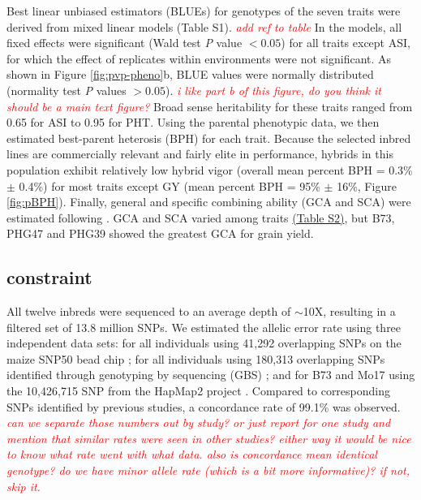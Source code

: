 \documentclass[9pt,twocolumn,twoside]{gsajnl}
\newcommand{\jri}[1]{\textcolor{red}{ \emph{ #1}} }
\begin{document}
Best linear unbiased estimators (BLUEs) for genotypes of the seven traits were derived from mixed linear models (Table S1). \DIFaddbegin \jri{add ref to table}
\DIFaddend In the models, all fixed effects were significant (Wald test \emph{P} value $<0.05$) for all traits except ASI, for which the effect of replicates within environments were not significant. 
As shown in Figure \ref{fig:pvp-pheno}b, BLUE values were normally distributed (normality test \emph{P} values $>0.05$). \DIFaddbegin \jri{i like part b of this figure, do you think it should be a main text figure?}
\DIFaddend Broad sense heritability for these traits ranged from 0.65 for ASI to 0.95 for PHT. 
Using the parental phenotypic data, we then estimated best-parent heterosis (BPH) for each trait.  
Because the selected inbred lines are commercially relevant and fairly elite in performance, hybrids in this population exhibit relatively low hybrid vigor (overall mean percent BPH = 0.3\% $\pm$ 0.4\%) for most traits except GY (mean percent BPH = 95\% $\pm$ 16\%, Figure \ref{fig:pBPH}). 
Finally, general and specific combining ability (GCA and SCA) were estimated following \citep{Falconer1996}. 
GCA and SCA varied among traits \href{run:https://github.com/RILAB/pvpDiallel/tree/master/manuscript/SI/Table_S2.CA.csv}{(Table S2)}\DIFdelbegin \DIFdelend , but B73, PHG47 and PHG39 showed the greatest GCA \DIFdelbegin \DIFdelend for grain yield.

\subsection*{\DIFdelbegin {}\DIFdelend \DIFaddbegin {}\DIFaddend constraint\DIFdelbegin {}\DIFdelend }

All twelve inbreds were sequenced to an average depth of $\sim$10X, resulting in a filtered set of 13.8 million SNPs. 
We estimated the allelic error rate using three independent data sets: for all individuals using 41,292 overlapping SNPs on the maize SNP50 bead chip \citep{Heerwaarden2012}; for all individuals using 180,313 overlapping SNPs identified through genotyping by sequencing (GBS) \citep{Romay2013}; and for B73 and Mo17 using the 10,426,715 SNP from the HapMap2 project \citep{Chia2012}.  \DIFdelbegin \DIFdelend Compared to corresponding SNPs identified by previous studies, a concordance rate of 99.1\% was observed. \DIFaddbegin \jri{can we separate those numbers out by study? or just report for one study and mention that similar rates were seen in other studies? either way it would be nice to know what rate went with what data. also is concordance mean identical genotype? do we have minor allele rate (which is a bit more informative)? if not, skip it.}
\DIFaddend 
\end{document}
